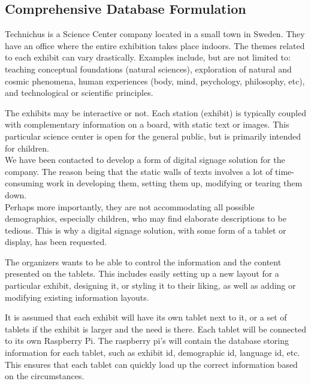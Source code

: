\documentclass{exam}
\begin{document}
\begin{center}
\section*{Comprehensive Database Formulation}
\end{center}
\bigskip
Technichus is a Science Center company located in a small town in Sweden. They have an office where the entire exhibition takes place indoors. The themes related to each exhibit can vary drastically. Examples include, but are not limited to: teaching conceptual foundations (natural sciences), exploration of natural and cosmic phenomena, human experiences (body, mind, psychology, philosophy, etc), and technological or scientific principles.\\
\bigskip

The exhibits may be interactive or not. Each station (exhibit) is typically coupled with complementary information on a board, with static text or images. This particular science center is open for the general public, but is primarily intended for children.\\
\bigskip
We have been contacted to develop a form of digital signage solution for the company. The reason being that the static walls of texts involves a lot of time-consuming work in developing them, setting them up, modifying or tearing them down.\\
\bigskip
Perhaps more importantly, they are not accommodating all possible demographics, especially children, who may find elaborate descriptions to be tedious. This is why a digital signage solution, with some form of a tablet or display, has been requested.\\
\bigskip

The organizers wants to be able to control the information and the content presented on the tablets. This includes easily setting up a new layout for a particular exhibit, designing it, or styling it to their liking, as well as adding or modifying existing information layouts.\\
\bigskip

It is assumed that each exhibit will have its own tablet next to it, or a set of tablets if the exhibit is larger and the need is there. Each tablet will be connected to its own Raspberry Pi. The raspberry pi's will contain the database storing information for each tablet, such as exhibit id, demographic id, language id, etc. This ensures that each tablet can quickly load up the correct information based on the circumstances.\\
\bigskip
\bigskip
\end{document}
